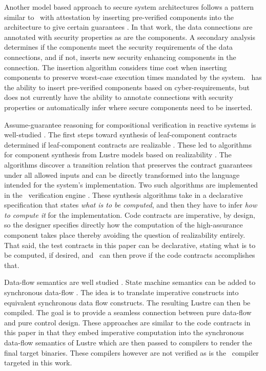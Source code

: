 
Another model based approach to secure system architectures follows a pattern similar to \brfcs\ with attestation by inserting pre-verified components into the architecture to give certain guarantees \cite{6209212}.
In that work, the data connections are annotated with security properties as are the components.
A secondary analysis determines if the components meet the security requirements of the data connections, and if not, inserts new security enhancing components in the connection.
The insertion algorithm considers time cost when inserting components to preserve worst-case execution times mandated by the system.
\brfcs\ has the ability to insert pre-verified components based on cyber-requirements, but does not currently have the ability to annotate connections with security properties or automatically infer where secure components need to be inserted. 

Assume-guarantee reasoning for compositional verification in reactive systems is well-studied \cite{10.1007/978-3-642-28891-3_13, 10.1145/2658982.2527272, 10.1007/978-3-319-17524-9_7}.
The first steps toward synthesis of leaf-component contracts determined if leaf-component contracts are realizable \cite{10.1007/978-3-319-17524-9_13, 10.1007/978-3-319-29613-5_7}.
These led to algorithms for component synthesis from Lustre models based on realizability \cite{katis2017synthesis, 10.1007/978-3-319-89963-3_10}.
The algorithms discover a transition relation that preserves the contract guarantees under all allowed inputs and can be directly transformed into the language intended for the system's implementation.
Two such algorithms are implemented in the \agr\ verification engine \cite{jkind}.
These synthesis algorithms take in a declarative specification that states \emph{what is to be computed}, and then they have to infer \emph{how to compute it} for the implementation.
Code contracts are imperative, by design, so the designer specifies directly how the computation of the high-assurance component takes place thereby avoiding the question of realizability entirely.
That said, the test contracts in this paper can be declarative, stating what is to be computed, if desired, and \agr\ can then prove if the code contracts accomplishes that.

Data-flow semantics are well studied \cite{10.1145/41625.41641,97300,
10.1145/1379023.1375674,10.1145/2345141.2248426,10.1007/978-3-540-45212-6_10}.
State machine semantics can be added to synchronous
data-flow \cite{10.1145/1086228.1086261}. The idea is to translate
imperative constructs into equivalent synchronous data flow
constructs. The resulting Lustre can then be compiled. The goal is to
provide a seamless connection between pure data-flow and pure control
design.
These approaches are similar to the code contracts in this paper in that they embed imperative computation into the synchronous data-flow semantics of Lustre which are then passed to compilers to render the final target binaries.
These compilers however are not verified as is the \ckml\ compiler targeted in this work.

